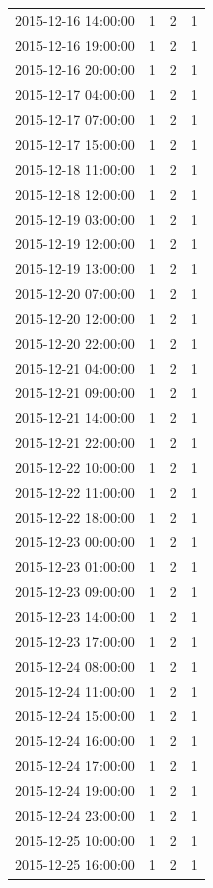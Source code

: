 \begin{tabular}{lrrr}
2015-12-16 14:00:00 & 1 & 2 & 1 \\
2015-12-16 19:00:00 & 1 & 2 & 1 \\
2015-12-16 20:00:00 & 1 & 2 & 1 \\
2015-12-17 04:00:00 & 1 & 2 & 1 \\
2015-12-17 07:00:00 & 1 & 2 & 1 \\
2015-12-17 15:00:00 & 1 & 2 & 1 \\
2015-12-18 11:00:00 & 1 & 2 & 1 \\
2015-12-18 12:00:00 & 1 & 2 & 1 \\
2015-12-19 03:00:00 & 1 & 2 & 1 \\
2015-12-19 12:00:00 & 1 & 2 & 1 \\
2015-12-19 13:00:00 & 1 & 2 & 1 \\
2015-12-20 07:00:00 & 1 & 2 & 1 \\
2015-12-20 12:00:00 & 1 & 2 & 1 \\
2015-12-20 22:00:00 & 1 & 2 & 1 \\
2015-12-21 04:00:00 & 1 & 2 & 1 \\
2015-12-21 09:00:00 & 1 & 2 & 1 \\
2015-12-21 14:00:00 & 1 & 2 & 1 \\
2015-12-21 22:00:00 & 1 & 2 & 1 \\
2015-12-22 10:00:00 & 1 & 2 & 1 \\
2015-12-22 11:00:00 & 1 & 2 & 1 \\
2015-12-22 18:00:00 & 1 & 2 & 1 \\
2015-12-23 00:00:00 & 1 & 2 & 1 \\
2015-12-23 01:00:00 & 1 & 2 & 1 \\
2015-12-23 09:00:00 & 1 & 2 & 1 \\
2015-12-23 14:00:00 & 1 & 2 & 1 \\
2015-12-23 17:00:00 & 1 & 2 & 1 \\
2015-12-24 08:00:00 & 1 & 2 & 1 \\
2015-12-24 11:00:00 & 1 & 2 & 1 \\
2015-12-24 15:00:00 & 1 & 2 & 1 \\
2015-12-24 16:00:00 & 1 & 2 & 1 \\
2015-12-24 17:00:00 & 1 & 2 & 1 \\
2015-12-24 19:00:00 & 1 & 2 & 1 \\
2015-12-24 23:00:00 & 1 & 2 & 1 \\
2015-12-25 10:00:00 & 1 & 2 & 1 \\
2015-12-25 16:00:00 & 1 & 2 & 1 \\

\end{tabular}
